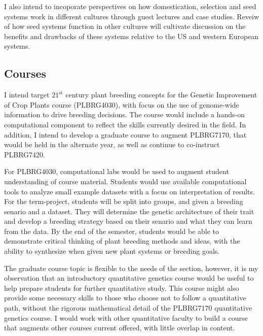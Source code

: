 \documentclass[11pt]{article}
\begin{document}
I also intend to incoporate perspectives on how domestication, selection and seed systems work in different cultures through guest lectures and case studies. Reveiw of how seed systems function in other cultures will cultivate discussion on the benefits and drawbacks of these systems relative to the US and western European systems. 

\subsection*{Courses}

I intend target $21^\text{st}$ century plant breeding concepts for the Genetic Improvement of Crop Plants course (PLBRG4030), with focus on the use of genome-wide information to drive breeding decisions. The course would include a hands-on computational component to reflect the skills currently desired in the field. In addition, I intend to develop a graduate course to augment PLBRG7170, that would be held in the alternate year, as well as continue to co-instruct PLBRG7420. 


For PLBRG4030, computational labs would be used to augment student understanding of course material. Students would use available computational tools to analyze small example datasets with a focus on interpretation of results. For the term-project, students will be split into groups, and given a breeding senario and a dataset. They will determine the genetic architecture of their trait and develop a breeding strategy based on their senario and what they can learn from the data. By the end of the semester, students would be able to demonstrate critical thinking of plant breeding methods and ideas, with the ability to synthesize when given new plant systems or breeding goals. 


The graduate course topic is flexible to the needs of the section, however, it is my observation that an introductory quantitative genetics course would be useful to help prepare students for further quantitative study. This course might also provide some necessary skills to those who choose not to follow a quantitative path, without the rigorous mathematical detail of the PLBRG7170 quantitative genetics course. I would work with other quantitative faculty to build a course that augments other courses current offered, with little overlap in content. 
\end{document}
